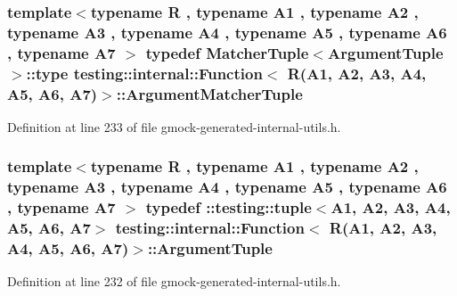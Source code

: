 \subsubsection[{\texorpdfstring{Argument\+Matcher\+Tuple}{ArgumentMatcherTuple}}]{\setlength{\rightskip}{0pt plus 5cm}template$<$typename R , typename A1 , typename A2 , typename A3 , typename A4 , typename A5 , typename A6 , typename A7 $>$ typedef {\bf Matcher\+Tuple}$<${\bf Argument\+Tuple}$>$\+::type {\bf testing\+::internal\+::\+Function}$<$ {\bf R}(A1, A2, A3, A4, A5, A6, A7)$>$\+::{\bf Argument\+Matcher\+Tuple}}\hypertarget{structtesting_1_1internal_1_1_function_3_01_r_07_a1_00_01_a2_00_01_a3_00_01_a4_00_01_a5_00_01_a6_00_01_a7_08_4_a76b4296ad8b88922e997170875e9198d}{}\label{structtesting_1_1internal_1_1_function_3_01_r_07_a1_00_01_a2_00_01_a3_00_01_a4_00_01_a5_00_01_a6_00_01_a7_08_4_a76b4296ad8b88922e997170875e9198d}


Definition at line 233 of file gmock-\/generated-\/internal-\/utils.\+h.

\subsubsection[{\texorpdfstring{Argument\+Tuple}{ArgumentTuple}}]{\setlength{\rightskip}{0pt plus 5cm}template$<$typename R , typename A1 , typename A2 , typename A3 , typename A4 , typename A5 , typename A6 , typename A7 $>$ typedef \+::testing\+::tuple$<$A1, A2, A3, A4, A5, A6, A7$>$ {\bf testing\+::internal\+::\+Function}$<$ {\bf R}(A1, A2, A3, A4, A5, A6, A7)$>$\+::{\bf Argument\+Tuple}}\hypertarget{structtesting_1_1internal_1_1_function_3_01_r_07_a1_00_01_a2_00_01_a3_00_01_a4_00_01_a5_00_01_a6_00_01_a7_08_4_a6bbc1f28c56e599aca98ab8ae7caf9ab}{}\label{structtesting_1_1internal_1_1_function_3_01_r_07_a1_00_01_a2_00_01_a3_00_01_a4_00_01_a5_00_01_a6_00_01_a7_08_4_a6bbc1f28c56e599aca98ab8ae7caf9ab}


Definition at line 232 of file gmock-\/generated-\/internal-\/utils.\+h.

